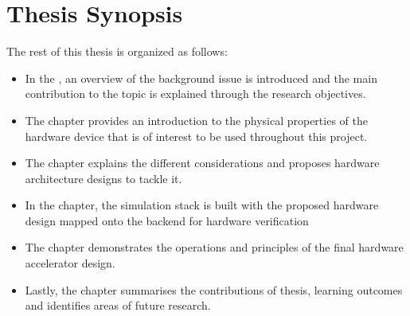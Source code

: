 \section{Thesis Synopsis}

\noindent
The rest of this thesis is organized as follows:

\begin{itemize}
  \item
  In the , an overview of the background issue is introduced and the main contribution to the topic is explained through the research objectives.
  \item
  The  chapter provides an introduction to the physical properties of the hardware device that is of interest to be used throughout this project.
  \item
  The  chapter explains the different considerations and proposes hardware architecture designs to tackle it.
  \item
  In the  chapter, the simulation stack is built with the proposed hardware design mapped onto the backend for hardware verification
  \item
  The  chapter demonstrates the operations and principles of the final hardware accelerator design.
  \item
  Lastly, the  chapter summarises the contributions of thesis, learning outcomes and identifies areas of future research.
\end{itemize}